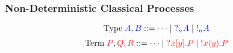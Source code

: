 \documentclass[xcolor={dvipsnames}]{beamer}
\begin{document}

\begin{frame}[label=nodcap]
  \frametitle{Non-Deterministic Classical Processes}
  \[
    \text{Type} \; \tm{A}, \tm{B} ::= \dots \mid \tm{\give[n]{A}} \mid \tm{\take[n]{A}}
  \]
  \[\!
    \begin{aligned}
      \text{Term} \; {\color{tm}P}, {\color{tm}Q}, {\color{tm}R} ::= \dots
      \mid {\color{tm}\give{\send{x}{y}P}}
      \mid {\color{tm}\take{\recv{x}{y}P}}
    \end{aligned}
  \]

  \begin{center}
    \begin{proofbox}[1]
      \SYM{\give[1]{}}
    \end{proofbox}
    \begin{proofbox}[1]
      \SYM{\take[1]{}}
    \end{proofbox}
  \end{center}

  \begin{proofblock}[1]
  \end{proofblock}
  \begin{proofblock}[1]
  \end{proofblock}
\end{frame}
\end{document}
